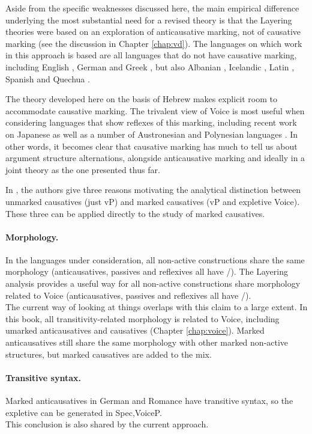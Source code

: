 Aside from the specific weaknesses discussed here, the main empirical difference underlying the most substantial need for a revised theory is that the Layering theories were based on an exploration of anticausative marking, not of causative marking (see the discussion in Chapter \ref{chap:vd}). The languages on which work in this approach is based are all languages that do not have causative marking, including English \citep{myler16mit}, German \citep{schaefer17oup} and Greek \citep{spathasetal15}, but also Albanian \citep{kallulli13}, Icelandic \cite{wood15springer}, Latin \citep{embick04,kastnerzu17}, Spanish \citep{schaefervivanco16} and Quechua \citep{myler16mit}.

The theory developed here on the basis of Hebrew makes explicit room to accommodate causative marking. The trivalent view of Voice is most useful when considering languages that show reflexes of this marking, including recent work on Japanese \citep{oseki17nyu} as well as a number of Austronesian and Polynesian languages \citep{nie17}. In other words, it becomes clear that causative marking has much to tell us about argument structure alternations, alongside anticausative marking and ideally in a joint theory as the one presented thus far.

In \citet[99--100]{layering15}, the authors give three reasons motivating the analytical distinction between unmarked causatives (just vP) and marked causatives (vP and expletive Voice). These three can be applied directly to the study of marked causatives.

\paragraph*{Morphology.} In the languages under consideration, all non-active constructions share the same morphology (anticausatives, passives and reflexives all have /). The Layering analysis provides a useful way for all non-active constructions share morphology related to Voice (anticausatives, passives and reflexives all have /).\\
	The current way of looking at things overlaps with this claim to a large extent. In this book, all transitivity-related morphology is related to Voice, including umarked anticausatives and causatives (Chapter \ref{chap:voice}). Marked anticausatives still share the same morphology with other marked non-active structures, but marked causatives are added to the mix.

\paragraph*{Transitive syntax.} Marked anticausatives in German and Romance have transitive syntax, so the expletive can be generated in Spec,VoiceP.\\
	This conclusion is also shared by the current approach.
	
